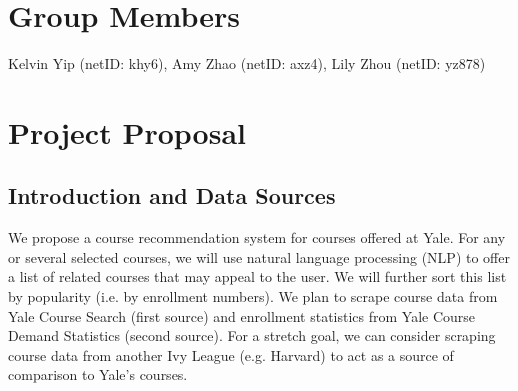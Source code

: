 \documentclass{article}
\begin{document}
\section*{Group Members}
Kelvin Yip (netID: khy6), Amy Zhao (netID: axz4), Lily Zhou (netID: yz878) 

\section*{Project Proposal}
\subsection*{Introduction and Data Sources}
We propose a course recommendation system for courses offered at Yale. For any or several selected courses, we will use natural language processing (NLP) to offer a list of related courses that may appeal to the user. We will further sort this list by popularity (i.e. by enrollment numbers). We plan to scrape course data from Yale Course Search (first source) and enrollment statistics from Yale Course Demand Statistics (second source). For a stretch goal, we can consider scraping course data from another Ivy League (e.g. Harvard) to act as a source of comparison to Yale's courses. 
\end{document}
